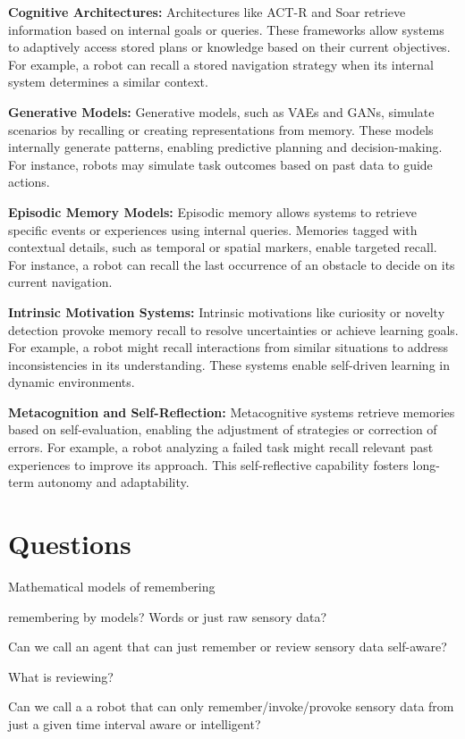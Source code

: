         \textbf{Cognitive Architectures:} Architectures like ACT-R and Soar retrieve information based on internal goals or queries. These frameworks allow systems to adaptively access stored plans or knowledge based on their current objectives. For example, a robot can recall a stored navigation strategy when its internal system determines a similar context. \cite{newell-1990-unified-theories-of-cognition}

        \textbf{Generative Models:} Generative models, such as VAEs and GANs, simulate scenarios by recalling or creating representations from memory. These models internally generate patterns, enabling predictive planning and decision-making. For instance, robots may simulate task outcomes based on past data to guide actions. \cite{goodfellow-2014-generative-adversarial-nets}

        \textbf{Episodic Memory Models:} Episodic memory allows systems to retrieve specific events or experiences using internal queries. Memories tagged with contextual details, such as temporal or spatial markers, enable targeted recall. For instance, a robot can recall the last occurrence of an obstacle to decide on its current navigation. \cite{tulving-1985-elements-of-episodic-memory}

        \textbf{Intrinsic Motivation Systems:} Intrinsic motivations like curiosity or novelty detection provoke memory recall to resolve uncertainties or achieve learning goals. For example, a robot might recall interactions from similar situations to address inconsistencies in its understanding. These systems enable self-driven learning in dynamic environments. \cite{oudeyer-2007-intrinsic-motivation}

        \textbf{Metacognition and Self-Reflection:} Metacognitive systems retrieve memories based on self-evaluation, enabling the adjustment of strategies or correction of errors. For example, a robot analyzing a failed task might recall relevant past experiences to improve its approach. This self-reflective capability fosters long-term autonomy and adaptability. \cite{cox-2005-metareasoning-and-meta-learning}


    



\section{Questions}
Mathematical models of remembering

remembering by models? Words or just raw sensory data?

Can we call an agent that can just remember or review sensory data self-aware?

What is reviewing?

Can we call a a robot that can only remember/invoke/provoke sensory data from just a given time interval aware or intelligent?

